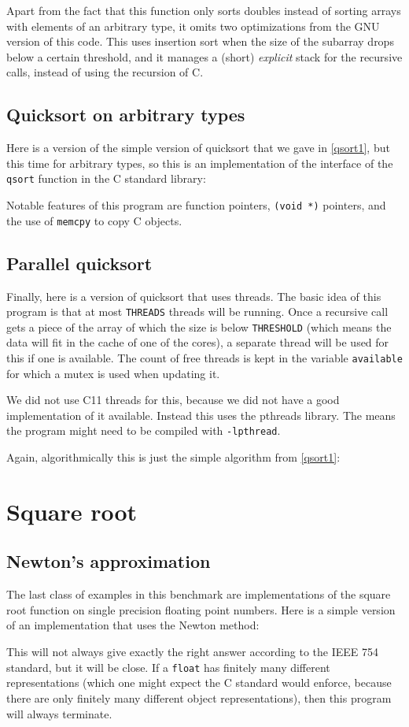 \documentclass{article}
\begin{document}
Apart from the fact that this function only sorts doubles instead
of sorting arrays with elements of an arbitrary type,
it omits two optimizations from the GNU version of this code.
This uses insertion sort when the size of the subarray drops
below a certain threshold,
and it manages a (short) \emph{explicit} stack for the recursive calls,
instead of using the recursion of C.

\subsection{Quicksort on arbitrary types}
Here is a version of the simple version of quicksort that
we gave in \ref{qsort1}, but this time for arbitrary types, so this is an
implementation of the interface of the \lstinline{qsort} function in the C standard library:

Notable features of this program are function pointers,
\lstinline|(void *)| pointers, and the use of \lstinline|memcpy| to
copy C objects.

\subsection{Parallel quicksort}
Finally, here is a version of quicksort that uses threads.
The basic idea of this program is that at most \lstinline|THREADS| threads will be
running.
Once a recursive call gets a piece of the array of which the size is
below \lstinline|THRESHOLD| (which
means the data will fit in the cache of one of the cores), a separate
thread will be used for this if one is available.
The count of free threads is kept in the variable \lstinline|available|
for which a mutex is used when updating it.

We did not use C11 threads for this, because we did not have a good implementation of it available.
Instead this uses the pthreads library.
The means the program might need to be compiled
with \lstinline{-lpthread}.

Again, algorithmically this is just the simple algorithm from \ref{qsort1}:


\section{Square root}
\subsection{Newton's approximation}
The last class of examples in this benchmark are implementations
of the square root function on single precision floating point numbers.
Here is a simple version of an implementation that uses the Newton method:

This will not always give exactly the right answer according to the IEEE 754
standard, but it will be close.
If a \lstinline|float| has finitely many different representations
(which one might expect the C standard would enforce, because there are only
finitely many different object representations), then this program will
always terminate.
\end{document}
